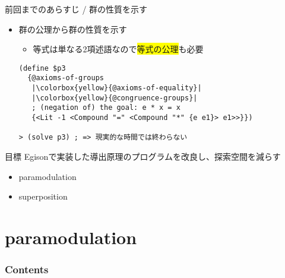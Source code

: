 \documentclass[dvipdfmx,11pt,notheorems]{beamer}
\theoremstyle{definition}
\begin{document}
\begin{frame}[fragile]{前回までのあらすじ / 群の性質を示す}
  \begin{itemize}
    \item 群の公理から群の性質を示す
    \begin{itemize}
      \item 等式は単なる2項述語なので\colorbox{yellow}{等式の公理}も必要
    \end{itemize}
    \begin{verbatim}
(define $p3
  {@axioms-of-groups
   |\colorbox{yellow}{@axioms-of-equality}|
   |\colorbox{yellow}{@congruence-groups}|
   ; (negation of) the goal: e * x = x
   {<Lit -1 <Compound "=" <Compound "*" {e e1}> e1>>}})

> (solve p3) ; => 現実的な時間では終わらない
    \end{verbatim}
  \end{itemize}
  \begin{block}{目標}
    Egisonで実装した導出原理のプログラムを改良し、探索空間を減らす
    \begin{itemize}
      \item paramodulation
      \item superposition
    \end{itemize}
  \end{block}
\end{frame}

\section{paramodulation}

\begin{frame}\frametitle{Contents}
\tableofcontents[currentsection]
\end{frame}
\end{document}
